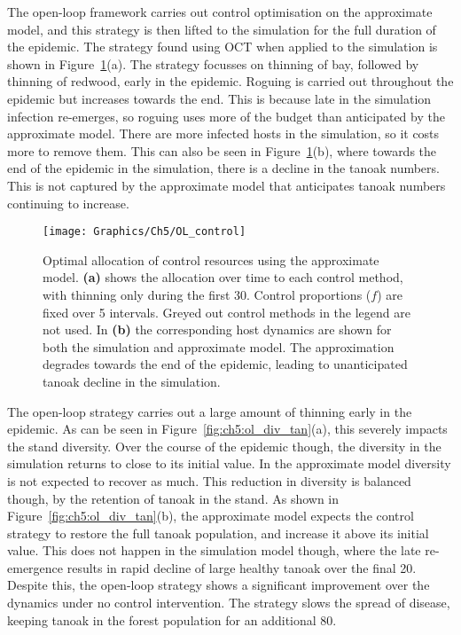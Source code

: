 The open-loop framework carries out control optimisation on the approximate model, and this strategy is then lifted to the simulation for the full duration of the epidemic. The strategy found using OCT when applied to the simulation is shown in Figure~\ref{fig:ch5:ol_strat}(a). The strategy focusses on thinning of bay, followed by thinning of redwood, early in the epidemic. Roguing is carried out throughout the epidemic but increases towards the end. This is because late in the simulation infection re-emerges, so roguing uses more of the budget than anticipated by the approximate model. There are more infected hosts in the simulation, so it costs more to remove them. This can also be seen in Figure~\ref{fig:ch5:ol_strat}(b), where towards the end of the epidemic in the simulation, there is a decline in the tanoak numbers. This is not captured by the approximate model that anticipates tanoak numbers continuing to increase.

\begin{figure}[!t]
    \begin{center}
        \texttt{[image: Graphics/Ch5/OL\_control]}
        \caption[Open-loop control strategy]{Optimal allocation of control resources using the approximate model. \textbf{(a)} shows the allocation over time to each control method, with thinning only during the first \SI{30}{\years{}}. Control proportions ($f$) are fixed over \SI{5}{\year} intervals. Greyed out control methods in the legend are not used. In \textbf{(b)} the corresponding host dynamics are shown for both the simulation and approximate model. The approximation degrades towards the end of the epidemic, leading to unanticipated tanoak decline in the simulation.\label{fig:ch5:ol_strat}}
    \end{center}
\end{figure}

The open-loop strategy carries out a large amount of thinning early in the epidemic. As can be seen in Figure~\ref{fig:ch5:ol_div_tan}(a), this severely impacts the stand diversity. Over the course of the epidemic though, the diversity in the simulation returns to close to its initial value. In the approximate model diversity is not expected to recover as much. This reduction in diversity is balanced though, by the retention of tanoak in the stand. As shown in Figure~\ref{fig:ch5:ol_div_tan}(b), the approximate model expects the control strategy to restore the full tanoak population, and increase it above its initial value. This does not happen in the simulation model though, where the late re-emergence results in rapid decline of large healthy tanoak over the final \SI{20}{\years}. Despite this, the open-loop strategy shows a significant improvement over the dynamics under no control intervention. The strategy slows the spread of disease, keeping tanoak in the forest population for an additional \SI{80}{\years}.

